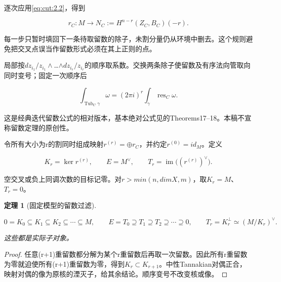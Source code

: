 \documentclass[11pt,a4paper,oneside]{ctexrep}
\theoremstyle{cnplain}
\newtheorem{theorem}{定理}[chapter]
\theoremstyle{definition}
\theoremstyle{remark}
\begin{document}
逐次应用\eqref{eq:cut:2.2}，得到

\begin{equation}
r_C:M\longrightarrow N_C:=H^{n-r}(Z_C,B_C)(-r).       \label{eq:cut:3.1}
\end{equation}

每一步只暂时填回下一条待取留数的除子，未割分量仍从环境中删去。这个规则避免把交叉点误当作留数形式必须在其上正则的点。

局部按\(dz_{i_{1}}/z_{i_{1}}\wedge \)\ldots{}\(\wedge dz_{i_r}/z_{i_r}\)的顺序取系数。交换两条除子使留数及有序法向管取向同时变号；固定一次顺序后

\begin{equation}
\int_{\operatorname{Tub}_C\gamma}\omega
       =(2\pi i)^r\int_\gamma\operatorname{res}_C\omega.\label{eq:cut:3.2}
\end{equation}

这是经典迭代留数公式的相对版本，基本绝对公式见\cite{muhlbauer}的Theorems17--18。本稿不宣称留数定理的原创性。

令所有大小为r的割同时组成映射\(r^{(r)}=\oplus r_C\)，并约定\(r^{(0)}=id_M\)。定义

\begin{equation}
K_r=\ker r^{(r)},\qquad E=M^\vee,\qquad
 T_r=\operatorname{im}\bigl((r^{(r)})^\vee\bigr).
                                                               \label{eq:cut:3.3}
\end{equation}

空交叉或负上同调次数的目标记零。对\(r>min(n,dimX,m)\)，取\(K_r=M\)、\(T_r=0\)。

\begin{theorem}[固定模型的留数过滤]

\label{thm:cut:3.1}

\begin{equation}
0=K_0\subseteq K_1\subseteq K_2\subseteq\cdots\subseteq M,
 \qquad E=T_0\supseteq T_1\supseteq T_2\supseteq\cdots\supseteq0,
 \qquad T_r=K_r^\perp\simeq(M/K_r)^\vee.              \label{eq:cut:3.4}
\end{equation}

这些都是实际子对象。

\end{theorem}

\begin{proof}

任意(r+1)重留数都分解为某个r重留数后再取一次留数。因此所有r重留数为零就迫使所有(r+1)重留数为零，得到\(K_r\subset K_{r+1}\)。中性Tannakian对偶正合，映射对偶的像为原核的湮灭子，给其余结论。顺序变号不改变核或像。

\end{proof}
\end{document}
